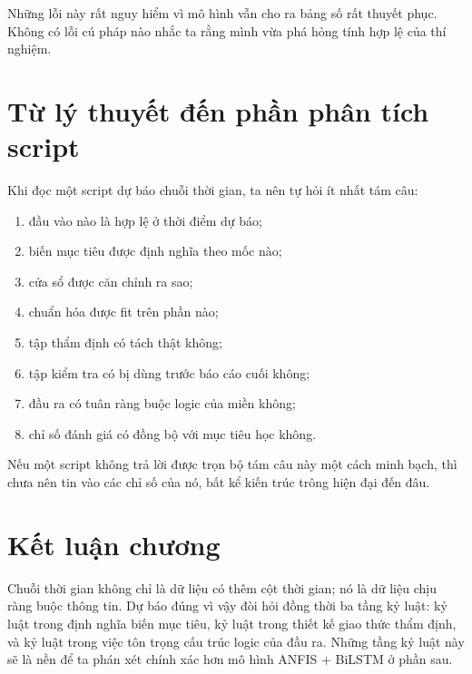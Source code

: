 Những lỗi này rất nguy hiểm vì mô hình vẫn cho ra bảng số rất thuyết phục. Không có lỗi cú pháp nào nhắc ta rằng mình vừa phá hỏng tính hợp lệ của thí nghiệm.

\section{Từ lý thuyết đến phần phân tích script}

Khi đọc một script dự báo chuỗi thời gian, ta nên tự hỏi ít nhất tám câu:

\begin{enumerate}
\item đầu vào nào là hợp lệ ở thời điểm dự báo;
\item biến mục tiêu được định nghĩa theo mốc nào;
\item cửa sổ được căn chỉnh ra sao;
\item chuẩn hóa được fit trên phần nào;
\item tập thẩm định có tách thật không;
\item tập kiểm tra có bị dùng trước báo cáo cuối không;
\item đầu ra có tuân ràng buộc logic của miền không;
\item chỉ số đánh giá có đồng bộ với mục tiêu học không.
\end{enumerate}

Nếu một script không trả lời được trọn bộ tám câu này một cách minh bạch, thì chưa nên tin vào các chỉ số của nó, bất kể kiến trúc trông hiện đại đến đâu.

\section{Kết luận chương}

Chuỗi thời gian không chỉ là dữ liệu có thêm cột thời gian; nó là dữ liệu chịu ràng buộc thông tin. Dự báo đúng vì vậy đòi hỏi đồng thời ba tầng kỷ luật: kỷ luật trong định nghĩa biến mục tiêu, kỷ luật trong thiết kế giao thức thẩm định, và kỷ luật trong việc tôn trọng cấu trúc logic của đầu ra. Những tầng kỷ luật này sẽ là nền để ta phán xét chính xác hơn mô hình ANFIS + BiLSTM ở phần sau.
